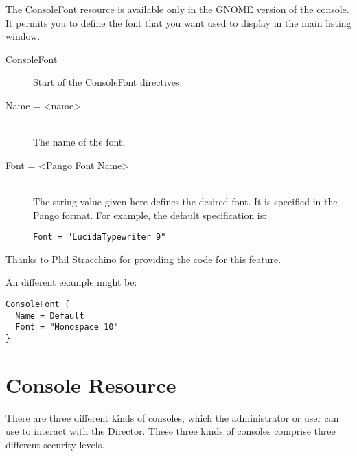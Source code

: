 The ConsoleFont resource is available only in the GNOME version of the
console. It permits you to define the font that you want used to display in
the main listing window.

\begin{description}

\item [ConsoleFont]
Start of the ConsoleFont directives.

\item [Name = {\textless}name{\textgreater}] \hfill \\
The name of the font.

\item [Font = {\textless}Pango Font Name{\textgreater}] \hfill \\
The string value given here defines the desired font. It  is specified in the
Pango format. For example, the default specification is:

\footnotesize
\begin{verbatim}
Font = "LucidaTypewriter 9"
\end{verbatim}
\normalsize

\end{description}

Thanks to Phil Stracchino for providing the code for this feature.

An different example might be:

\footnotesize
\begin{verbatim}
ConsoleFont {
  Name = Default
  Font = "Monospace 10"
}
\end{verbatim}
\normalsize

\section{Console Resource}
\label{ConsoleResource}

There are three different kinds of consoles, which the administrator or
user can use to interact with the Director.  These three kinds of consoles
comprise three different security levels.

